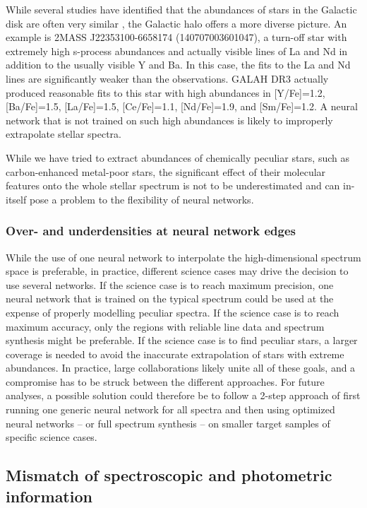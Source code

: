\documentclass[
  journal=pasa,
  manuscript=research-paper, %
  year=2024,
  volume=37
]{cup-journal}
\begin{document}
While several studies have identified that the abundances of stars in the Galactic disk are often very similar \citep[e.g.][]{Ness2019b}, the Galactic halo offers a more diverse picture. An example is 2MASS J22353100-6658174 (140707003601047), a turn-off star with extremely high s-process abundances and actually visible lines of La and Nd in addition to the usually visible Y and Ba. In this case, the fits to the La and Nd lines are significantly weaker than the observations. GALAH DR3 actually produced reasonable fits to this star with high abundances in [Y/Fe]=1.2, [Ba/Fe]=1.5, [La/Fe]=1.5, [Ce/Fe]=1.1, [Nd/Fe]=1.9, and [Sm/Fe]=1.2. A neural network that is not trained on such high abundances is likely to improperly extrapolate stellar spectra.

While we have tried to extract abundances of chemically peculiar stars, such as carbon-enhanced metal-poor stars, the significant effect of their molecular features onto the whole stellar spectrum is not to be underestimated and can in-itself pose a problem to the flexibility of neural networks.

\subsubsection{Over- and underdensities at neural network edges}

While the use of one neural network to interpolate the high-dimensional spectrum space is preferable, in practice, different science cases may drive the decision to use several networks.
If the science case is to reach maximum precision, one neural network that is trained on the typical spectrum could be used at the expense of properly modelling peculiar spectra.
If the science case is to reach maximum accuracy, only the regions with reliable line data and spectrum synthesis might be preferable.
If the science case is to find peculiar stars, a larger coverage is needed to avoid the inaccurate extrapolation of stars with extreme abundances.
In practice, large collaborations likely unite all of these goals, and a compromise has to be struck between the different approaches.
For future analyses, a possible solution could therefore be to follow a 2-step approach of first running one generic neural network for all spectra and then using optimized neural networks -- or full spectrum synthesis -- on smaller target samples of specific science cases.

\subsection{Mismatch of spectroscopic and photometric information} \label{sec:caveats_photospec}
\end{document}
